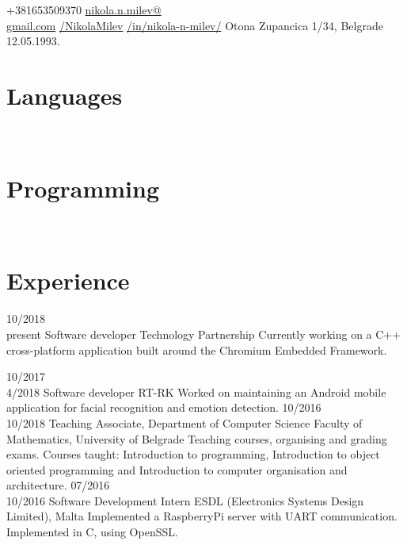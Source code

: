 \documentclass[a4paper]{my_cv}
\begin{document}
\thispagestyle{empty}	
	{+381653509370}
 	{\href{mailto:nikola.n.milev@gmail.com}{nikola.n.milev@\\gmail.com}}
	{ \href{https://github.com/NikolaMilev}{/NikolaMilev}} 	
 	{ \href{https://www.linkedin.com/in/nikola-n-milev/}{/in/nikola-n-milev/}}
	{ Otona Zupancica 1/34, Belgrade }
	{12.05.1993.}


 
\begin{aside}
\section{Languages}
\bodyfont{}
~
~
\section{Programming}
\end {aside}
~
~\\
\section{Experience}
\begin{entrylist}
\entry
    {10/2018~\textemdash \\present}
    {Software developer}
    {Technology Partnership}
    {Currently working on a C++ cross-platform application built around the Chromium Embedded Framework.}
    
\entry
    {10/2017~\textemdash \\4/2018}
    {Software developer}
    {RT-RK}
    {Worked on maintaining an Android mobile application for facial recognition and emotion detection.}
\entry
    {10/2016~\textemdash \\10/2018}
    {Teaching Associate, Department of Computer Science}
    {Faculty of Mathematics, University of Belgrade}
    {Teaching courses, organising and grading exams. Courses taught: Introduction to programming, Introduction to object oriented programming and Introduction to computer organisation and architecture.}
\entry
    {07/2016~\textemdash \\10/2016}
    {Software Development Intern}
    {ESDL (Electronics Systems Design Limited), Malta}
    {Implemented a RaspberryPi server with UART communication. Implemented in C, using OpenSSL.}
\end{entrylist}
\end{document}
